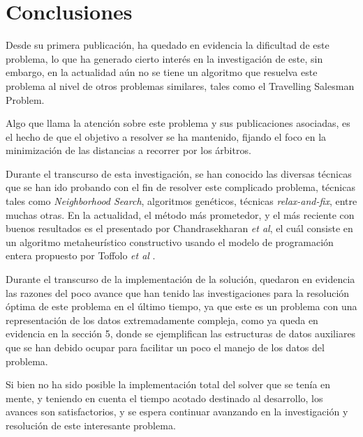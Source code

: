 \documentclass[letter, 10pt]{article}
\begin{document}
\section{Conclusiones}


Desde su primera publicaci\'on, ha quedado en evidencia la dificultad de este problema, lo que ha generado cierto inter\'es en la investigaci\'on de este, sin embargo, en la actualidad a\'un no se tiene un algoritmo que resuelva este problema al nivel de otros problemas similares, tales como el Travelling Salesman Problem.\cite{trick_2007}

Algo que llama la atenci\'on sobre este problema y sus publicaciones asociadas, es el hecho de que el objetivo a resolver se ha mantenido, fijando el foco en la minimizaci\'on de las distancias a recorrer por los \'arbitros.

Durante el transcurso de esta investigaci\'on, se han conocido las diversas t\'ecnicas que se han ido probando con el fin de resolver este complicado problema, t\'ecnicas tales como \emph{Neighborhood Search}, algoritmos gen\'eticos, t\'ecnicas \emph{relax-and-fix}, entre muchas otras. En la actualidad, el m\'etodo m\'as prometedor, y el m\'as reciente con buenos resultados es el presentado por Chandrasekharan \emph{et al}\cite{ChandrasekharanToffoloWauters+2019+41+57}, el cu\'al consiste en un algoritmo metaheur\'istico constructivo usando el modelo de programaci\'on entera propuesto por Toffolo \emph{et al} \cite{TOFFOLO2016737}.

Durante el transcurso de la implementaci\'on de la soluci\'on, quedaron en evidencia las razones del poco avance que han tenido las investigaciones para la resoluci\'on \'optima de este problema en el \'ultimo tiempo, ya que este es un problema con una representaci\'on de los datos extremadamente compleja, como ya queda en evidencia en la secci\'on 5, donde se ejemplifican las estructuras de datos auxiliares que se han debido ocupar para facilitar un poco el manejo de los datos del problema.

Si bien no ha sido posible la implementaci\'on total del solver que se ten\'ia en mente, y teniendo en cuenta el tiempo acotado destinado al desarrollo, los avances son satisfactorios, y se espera continuar avanzando en la investigaci\'on y resoluci\'on de este interesante problema.



\end{document}
